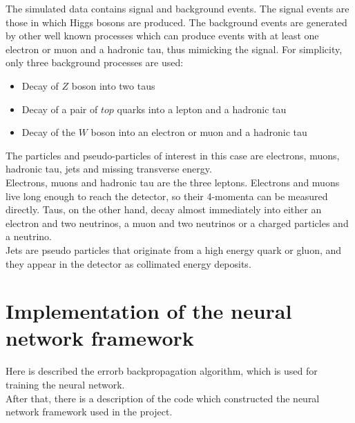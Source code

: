 \documentclass[12pt]{article}
\begin{document}
The simulated data contains signal and background events. The signal events are those in which Higgs bosons
are produced. The background events are generated by other well known processes which can produce events with 
at least one electron or muon and a hadronic tau, thus mimicking the signal. For simplicity, only three
background processes are used:
\begin{itemize}
  \item Decay of $Z$ boson into two taus
  \item Decay of a pair of $top$ quarks into a lepton and a hadronic tau
  \item Decay of the $W$ boson into an electron or muon and a hadronic tau
\end{itemize}
The particles and pseudo-particles of interest in this case are electrons, muons, hadronic tau, jets and 
missing transverse energy. \\
Electrons, muons and hadronic tau are the three leptons. Electrons and muons live long enough to reach the 
detector, so their 4-momenta can be measured directly. Taus, on the other hand, decay almost immediately 
into either an electron and two neutrinos, a muon and two neutrinos or a charged particles and a neutrino. \\
Jets are pseudo particles that originate from a high energy quark or gluon, and they appear in the detector 
as collimated energy deposits.

\section{Implementation of the neural network framework}
Here is described the errorb backpropagation algorithm, which is used for training the neural network. \\
After that, there is a description of the code which constructed the neural network framework used in the 
project. 
\end{document}
